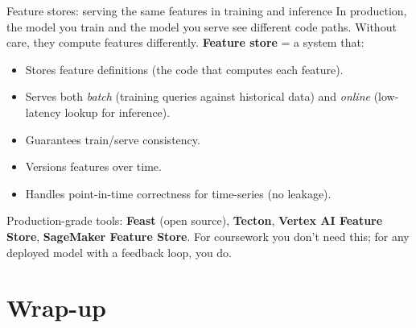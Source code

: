 \documentclass[aspectratio=169]{beamer}
\begin{document}
\begin{frame}{Feature stores: serving the same features in training and inference}
  In production, the model you train and the model you serve see different code paths. Without care, they compute features differently.
  \vfill
  \textbf{Feature store} = a system that:
  \begin{itemize}
    \item Stores feature definitions (the code that computes each feature).
    \item Serves both \emph{batch} (training queries against historical data) and \emph{online} (low-latency lookup for inference).
    \item Guarantees train/serve consistency.
    \item Versions features over time.
    \item Handles point-in-time correctness for time-series (no leakage).
  \end{itemize}
  \vfill
  Production-grade tools: \textbf{Feast} (open source), \textbf{Tecton}, \textbf{Vertex AI Feature Store}, \textbf{SageMaker Feature Store}.
  \vfill
  \footnotesize For coursework you don't need this; for any deployed model with a feedback loop, you do.
\end{frame}

\section{Wrap-up}
\end{document}
